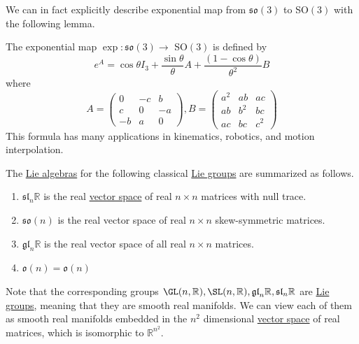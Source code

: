   We can in fact explicitly describe exponential map from $\mathfrak{so}(3)$ to SO$(3)$ with the following lemma. 

  \begin{lemma}
    \label{thm:rodrigues-formula}
    The exponential map $\exp: \mathfrak{so}(3) \rightarrow$ SO$(3)$ is defined by 
    \begin{equation}
      e^A = \cos{\theta} I_3 + \frac{\sin{\theta}}{\theta} A + \frac{(1 - \cos{\theta})}{\theta^2} B
    \end{equation}
    where 
    \begin{equation}
      A = \begin{pmatrix}
      0&-c&b\\c&0&-a\\-b&a&0
      \end{pmatrix}, B = \begin{pmatrix}
      a^2&ab&ac\\ab&b^2&bc\\ac&bc&c^2
      \end{pmatrix}
    \end{equation}
    This formula has many applications in kinematics, robotics, and motion interpolation. 
  \end{lemma}

  \begin{theorem}
    \label{thm:lie-algebras-of-the-classical-lie-groups}
  The \hyperref[def:lie-algebra]{Lie algebras} for the following classical \hyperref[def:lie-group]{Lie groups} are summarized as follows. 
  \begin{enumerate}
    \item $\mathfrak{sl}_n \mathbb{R}$ is the real \hyperref[def:vector-space]{vector space} of real $n \times n$ matrices with null trace.
    \item $\mathfrak{so}(n)$ is the real vector space of real $n \times n$ skew-symmetric matrices. 
    \item $\mathfrak{gl}_n \mathbb{R}$ is the real vector space of all real $n \times n$ matrices.
    \item $\mathfrak{o}(n) = \mathfrak{o}(n)$
  \end{enumerate}
  \end{theorem}
  Note that the corresponding groups $\GL(n, \mathbb{R}), \SL(n, \mathbb{R}), \mathfrak{gl}_n \mathbb{R}, \mathfrak{sl}_n \mathbb{R}$ are \hyperref[def:lie-group]{Lie groups}, meaning that they are smooth real manifolds. We can view each of them as smooth real manifolds embedded in the $n^2$ dimensional \hyperref[def:vector-space]{vector space} of real matrices, which is isomorphic to $\mathbb{R}^{n^2}$. 

